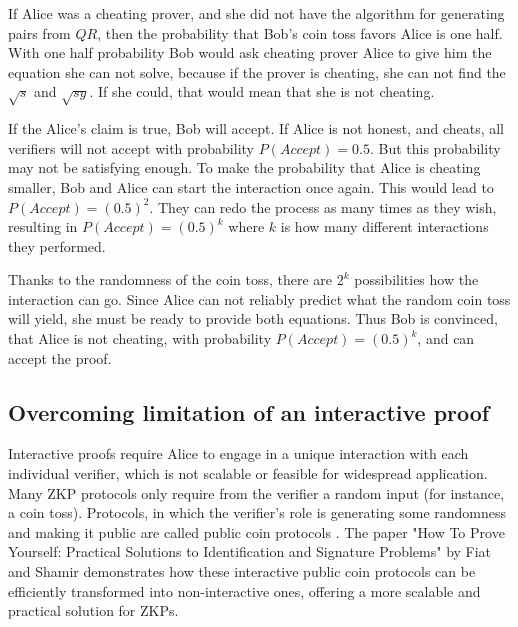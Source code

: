 \documentclass[conference,comsoc,10pt]{IEEEtran}
\begin{document}
        If Alice was a cheating prover, and she did not have the algorithm for
        generating pairs from $QR$, then the probability that Bob's coin toss favors
        Alice is one half. With one half probability Bob would ask cheating prover
        Alice to give him the equation she can not solve, because if the prover is
        cheating, she can not find the $\sqrt{s}$ and $\sqrt{sy}$. If she could,
        that would mean that she is not cheating.

        If the Alice's claim is true, Bob will accept. If Alice is not honest, and
        cheats, all verifiers will not accept with probability $P(Accept) = 0.5$.
        But this probability may not be satisfying enough. To make the probability
        that Alice is cheating smaller, Bob and Alice can start the interaction once
        again. This would lead to $P(Accept) = (0.5)^2$. They can redo the process
        as many times as they wish, resulting in $P(Accept) = (0.5)^k$ where $k$
        is how many different interactions they performed.

        Thanks to the randomness of the coin toss, there are $2^k$ possibilities how
        the interaction can go. Since Alice can not reliably predict what the random
        coin toss will yield, she must be ready to provide both equations. Thus Bob is
        convinced, that Alice is not cheating, with probability $P(Accept) = (0.5)^k$,
        and can accept the proof.

    \subsection{Overcoming limitation of an interactive proof}
        Interactive proofs require Alice to engage in a unique interaction with
        each individual verifier, which is not scalable or feasible for widespread
        application. Many ZKP protocols only require from the verifier a random input
        (for instance, a coin toss). Protocols, in which the verifier's role is
        generating some randomness and making it public are called public coin
        protocols \cite{Babai1988,Goldwasser1986}. The paper "How To Prove
        Yourself: Practical Solutions to Identification and Signature Problems"
        \cite{Fiat} by Fiat and Shamir demonstrates how these interactive public
        coin protocols can be efficiently transformed into non-interactive ones,
        offering a more scalable and practical solution for ZKPs.
\end{document}
